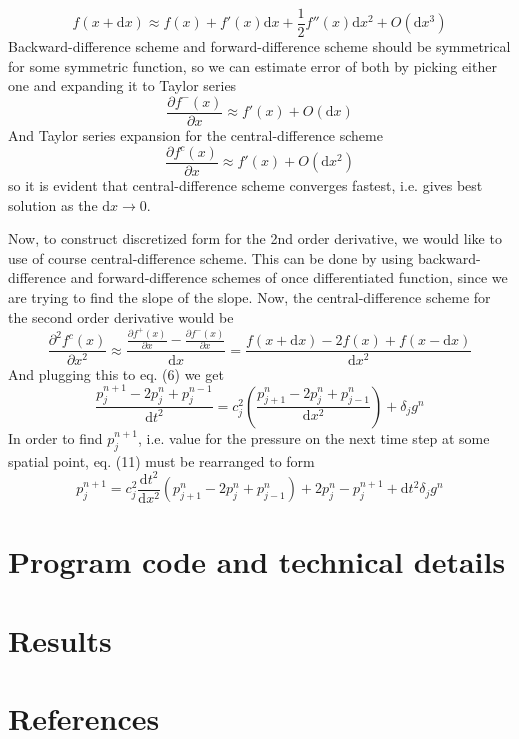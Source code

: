 \documentclass[]{article}
\begin{document}
\begin{equation}
	f\left(x+\textrm{d}x\right)\approx f\left(x\right)+f'\left(x\right)\textrm{d}x+\frac{1}{2}f''\left(x\right)\textrm{d}x^2+O\left(\textrm{d}x^3\right)
\end{equation}
Backward-difference scheme and forward-difference scheme should be symmetrical for some symmetric function, so we can estimate error of both by picking either one and expanding it to Taylor series
\begin{equation*}
	\frac{\partial f^-\left(x\right)}{\partial x}\approx f'\left(x\right)+O\left(\textrm{d}x\right)
\end{equation*}
And Taylor series expansion for the central-difference scheme
\begin{equation*}
	\frac{\partial f^c\left(x\right)}{\partial x}\approx f'\left(x\right)+O\left(\textrm{d}x^2\right)
\end{equation*}
so it is evident that central-difference scheme converges fastest, i.e. gives best solution as the $\textrm{d}x\rightarrow 0$. \par
Now, to construct discretized form for the 2nd order derivative, we would like to use of course central-difference scheme. This can be done by using backward-difference and forward-difference schemes of once differentiated function, since we are trying to find the slope of the slope. Now, the central-difference scheme for the second order derivative would be 
\begin{equation*}
	\frac{\partial^2 f^c\left(x\right)}{\partial x^2}\approx \frac{\frac{\partial f^+\left(x\right)}{\partial x}-\frac{\partial f^-\left(x\right)}{\partial x}}{\textrm{d}x}=\frac{f\left(x+\textrm{d}x\right)-2f\left(x\right)+f\left(x-\textrm{d}x\right)}{\textrm{d}x^2}
\end{equation*}
And plugging this to eq. (6) we get
\begin{equation}
	\frac{p_j^{n+1}-2p_j^n+p_j^{n-1}}{\textrm{d}t^2}=c^2_j\left(\frac{p_{j+1}^n-2p_j^n+p_{j-1}^n}{\textrm{d}x^2}\right)+\delta_j g^n
\end{equation}
In order to find $p_j^{n+1}$, i.e. value for the pressure on the next time step at some spatial point, eq. (11) must be rearranged to form
\begin{equation}
	p_j^{n+1}=c_j^2\frac{\textrm{d}t^2}{\textrm{d}x^2}\left(p^n_{j+1}-2p^n_j+p^n_{j-1}\right)+2p^n_j-p_j^{n+1}+\textrm{d}t^2\delta_j g^n	
\end{equation}

\newpage

\section{Program code and technical details}

\newpage

\section{Results}

\newpage

\section{References}

\newpage
\end{document}
